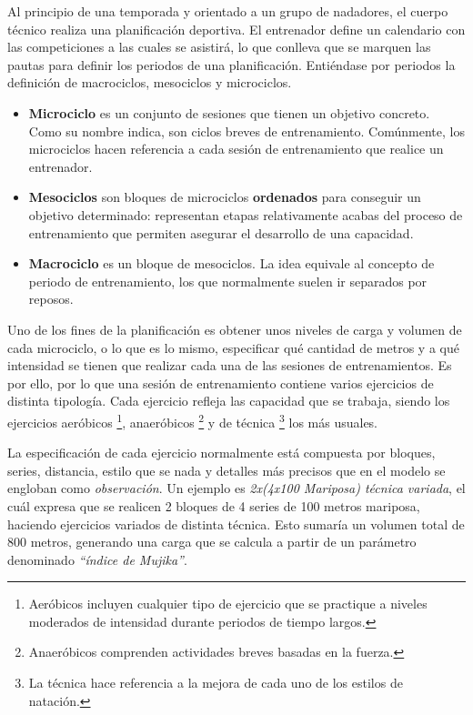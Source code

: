 	Al principio de una temporada y orientado a un grupo de nadadores, el cuerpo técnico realiza una planificación deportiva. El entrenador define un calendario con las competiciones a las cuales se asistirá, lo que conlleva que se marquen las pautas para definir los periodos de una planificación. Entiéndase por periodos la definición de macrociclos, mesociclos y microciclos.
	
	\begin{itemize}
		\item{{\bf Microciclo} es un conjunto de sesiones que tienen un objetivo concreto. Como su nombre indica, son ciclos breves de entrenamiento. Comúnmente, los microciclos hacen referencia a cada sesión de entrenamiento que realice un entrenador.}
		\item{{\bf Mesociclos} son bloques de microciclos {\bf ordenados} para conseguir un objetivo determinado: representan etapas relativamente acabas del proceso de entrenamiento que permiten asegurar el desarrollo de una capacidad.}
		\item{{\bf Macrociclo} es un bloque de mesociclos. La idea equivale al concepto de periodo de entrenamiento, los que normalmente suelen ir separados por reposos. } 
	\end{itemize}
	
	Uno de los fines de la planificación es obtener unos niveles de carga y volumen de cada microciclo, o lo que es lo mismo, especificar qué cantidad de metros y a qué intensidad se tienen que realizar cada una de las sesiones de entrenamientos. Es por ello, por lo que una sesión de entrenamiento contiene varios ejercicios de distinta tipología. Cada ejercicio refleja las capacidad que se trabaja, siendo los ejercicios aeróbicos \footnote{Aeróbicos incluyen cualquier tipo de ejercicio que se practique a niveles moderados de intensidad durante periodos de tiempo largos.}, anaeróbicos \footnote{Anaeróbicos comprenden actividades breves basadas en la fuerza.} y de técnica \footnote{La técnica hace referencia a la mejora de cada uno de los estilos de natación.} los más usuales.
	
	La especificación de cada ejercicio normalmente está compuesta por bloques, series, distancia, estilo que se nada y detalles más precisos que en el modelo se engloban como {\it observación}. Un ejemplo es {\it 2x(4x100 Mariposa) técnica variada}, el cuál expresa que se realicen 2 bloques de 4 series de 100 metros mariposa, haciendo ejercicios variados de distinta técnica. Esto sumaría un volumen total de 800 metros, generando una carga que se calcula a partir de un parámetro denominado {\it ``índice de Mujika''}.
	
